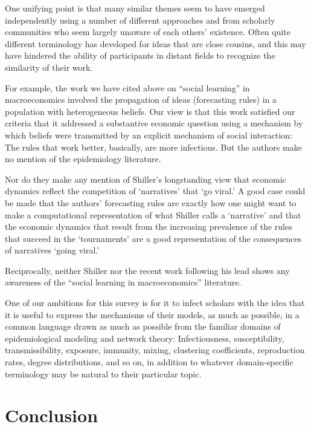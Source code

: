 One unifying point is that many similar themes seem to have emerged independently using a number of different approaches and from scholarly communities who seem largely unaware of each others' existence.  Often quite different terminology has developed for ideas that are close cousins, and this may have hindered the ability of participants in distant fields to recognize the similarity of their work.

For example, the work we have cited above on ``social learning'' in macroeconomics involved the propagation of ideas (forecasting rules) in a population with heterogeneous beliefs.  Our view is that this work satisfied our criteria that it addressed a substantive economic question using a mechanism by which beliefs were transmitted by an explicit mechanism of social interaction: The rules that work better, basically, are more infectious.  But the authors make no mention of the epidemiology literature.

Nor do they make any mention of Shiller's longstanding view that economic dynamics reflect the competition of `narratives' that `go viral.'  A good case could be made that the authors' forecasting rules are exactly how one might want to make a computational representation of what Shiller calls a `narrative' and that the economic dynamics that result from the increasing prevalence of the rules that succeed in the `tournaments' are a good representation of the consequences of narratives `going viral.'

Reciprocally, neither Shiller nor the recent work following his lead shows any awareness of the ``social learning in macroeconomics'' literature.

One of our ambitions for this survey is for it to infect scholars with the idea that it is useful to express the mechanisms of their models, as much as possible, in a common language drawn as much as possible from the familiar domains of epidemiological modeling and network theory:  Infectiousness, susceptibility, transmissibility, exposure, immunity, mixing, clustering coefficients, reproduction rates, degree distributions, and so on, in addition to whatever domain-specific terminology may be natural to their particular topic.

\section{Conclusion}


\newpage


